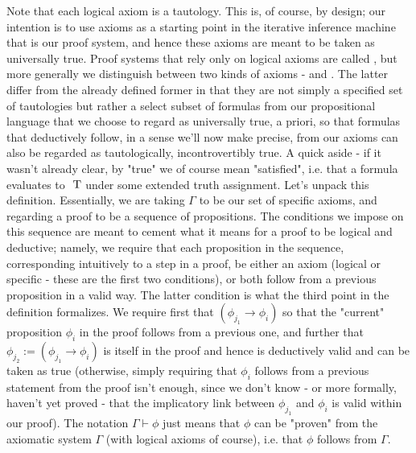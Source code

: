 \documentclass{article}
\begin{document}
\n
Note that each logical axiom is a tautology. This is, of course, by design; our intention is to use axioms as a starting point in the iterative inference machine that is our proof system, and hence these axioms are meant to be taken as universally true. Proof systems that rely only on logical axioms are called , but more generally we distinguish between two kinds of axioms -  and . The latter differ from the already defined former in that they are not simply a specified set of tautologies but rather a select subset of formulas from our propositional language that we choose to regard as universally true, a priori, so that formulas that deductively follow, in a sense we'll now make precise, from our axioms can also be regarded as tautologically, incontrovertibly true. A quick aside - if it wasn't already clear, by "true" we of course mean "satisfied", i.e. that a formula evaluates to $ \text{\normalfont\ T} $ under some extended truth assignment.
\n
Let's unpack this definition. Essentially, we are taking $ \Gamma $ to be our set of specific axioms, and regarding a proof to be a sequence of propositions. The conditions we impose on this sequence are meant to cement what it means for a proof to be logical and deductive; namely, we require that each proposition in the sequence, corresponding intuitively to a step in a proof, be either an axiom (logical or specific - these are the first two conditions), or both follow from a previous proposition in a valid way. The latter condition is what the third point in the definition formalizes. We require first that $ (\phi_{j_1} \rightarrow \phi_i) $ so that the "current" proposition $ \phi_i $ in the proof follows from a previous one, and further that $ \phi_{j_2} := (\phi_{j_1} \rightarrow \phi_i) $ is itself in the proof and hence is deductively valid and can be taken as true (otherwise, simply requiring that $ \phi_i $ follows from a previous statement from the proof isn't enough, since we don't know - or more formally, haven't yet proved - that the implicatory link between $ \phi_{j_1} $ and $ \phi_i $ is valid within our proof). The notation $ \Gamma \vdash \phi $ just means that $ \phi $ can be "proven" from the axiomatic system $ \Gamma $ (with logical axioms of course), i.e. that $ \phi $ follows from $ \Gamma $.
\end{document}
